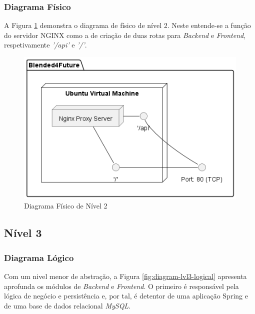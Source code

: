 \subsubsection{Diagrama Físico} 

A Figura \ref{fig:diagram-lvl2-physical} demonstra o diagrama de físico de nível 2. Neste entende-se a função do servidor \gls{NGINX} como a de criação de duas rotas para \textit{Backend} e \textit{Frontend}, respetivamente \textit{'/api'} e \textit{'/'}.

\begin{figure}[h!tbp]
    \centering
    \includegraphics[width=0.6\linewidth]{capitulos/cap3-analisedoproblema/assets/arquiteturasistema/physical/physical_l2.png}
    \caption{Diagrama Físico de Nível 2}
    \label{fig:diagram-lvl2-physical}
\end{figure}




\subsection{Nível 3}

\subsubsection{Diagrama Lógico}

Com um nivel menor de abstração, a Figura \ref{fig:diagram-lvl3-logical} apresenta aprofunda os módulos de \textit{Backend} e \textit{Frontend}. O primeiro é responsável pela lógica de negócio e persistência e, por tal, é detentor de uma aplicação Spring e de uma base de dados relacional \textit{MySQL}.

